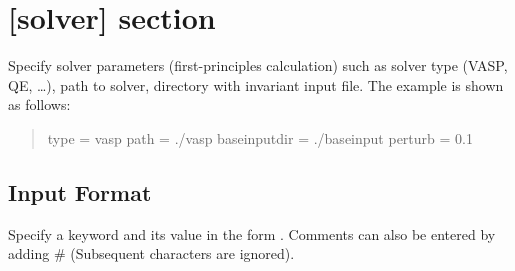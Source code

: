 \documentclass[letterpaper,10pt,english]{sphinxmanual}
\begin{document}
\section{{[}solver{]} section}
\label{\detokenize{file_specification/parameter_solver:solver-section}}\label{\detokenize{file_specification/parameter_solver::doc}}
Specify solver parameters (first-principles calculation) such as solver type (VASP, QE, …), path to solver, directory with invariant input file.
The example is shown as follows:
\begin{quote}

\begin{sphinxVerbatim}[commandchars=\\\{\}]
[solver]
type = \PYGZsq{}vasp\PYGZsq{}
path = \PYGZsq{}./vasp\PYGZsq{}
base\PYGZus{}input\PYGZus{}dir = \PYGZsq{}./baseinput\PYGZsq{}
perturb = 0.1
\end{sphinxVerbatim}
\end{quote}


\subsection{Input Format}
\label{\detokenize{file_specification/parameter_solver:input-format}}
Specify a keyword and its value in the form .
Comments can also be entered by adding \# (Subsequent characters are ignored).
\end{document}
